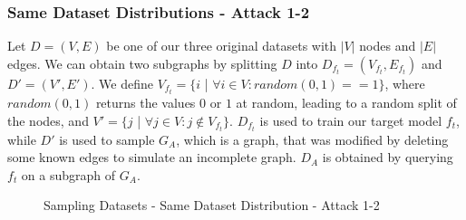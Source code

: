       \subsubsection*{Same Dataset Distributions - Attack 1-2}
        Let $D = (V, E)$ be one of our three original datasets with $|V|$ nodes and $|E|$ edges.
        We can obtain two subgraphs by splitting $D$ into $D_{f_t} = (V_{f_t}, E_{f_t})$ and $D' = (V', E')$.
        We define $V_{f_t} = \{i$ | $\forall i \in V: random(0, 1) == 1\}$, where $random(0, 1)$ returns the values $0$ or $1$ at random, leading to a random split of the nodes, and $V' = \{j$ | $\forall j \in V: j \not\in V_{f_t}\}$.
        $D_{f_t}$ is used to train our target model $f_t$, while $D'$ is used to sample $G_{A}$, which is a graph, that was modified by deleting some known edges to simulate an incomplete graph.
        $D_A$ is obtained by querying $f_t$ on a subgraph of $G_A$. 

        \vspace{0.48cm}
        \begin{figure}[h!]
          \begin{center}
          \end{center}
          \caption{Sampling Datasets - Same Dataset Distribution - Attack 1-2}
          \label{figure:sample-datasets-attack1-2}
        \end{figure}

